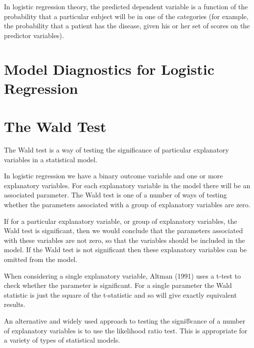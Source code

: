 \documentclass[a4paper,12pt]{article}
\begin{document}
In logistic regression theory, the predicted dependent variable is a function of the probability that a particular subject will be in one of the categories (for example, the probability that a patient has the disease, given his or her set of scores on the predictor variables).


\section{Model Diagnostics for Logistic Regression}



\section{The Wald Test}

The Wald test is a way of testing the significance of particular explanatory variables in a statistical model. 

In logistic regression we have a binary outcome variable and one or more explanatory variables. For each explanatory variable in the model there will be an associated parameter. The Wald test is one of a number of ways of testing whether the parameters associated with a group of explanatory variables are zero.

If for a particular explanatory variable, or group of explanatory variables, the Wald test is significant, then we would conclude that the parameters associated with these variables are not zero, so that the variables should be included in the model. If the Wald test is not significant then these explanatory variables can be omitted from the model. 

When considering a single explanatory variable, Altman (1991) uses a t-test to check whether the parameter is significant. For a single parameter the Wald statistic is just the square of the t-statistic and so will give exactly equivalent results.

An alternative and widely used approach to testing the signi®cance of a number of explanatory variables is to use the likelihood ratio test. This is appropriate for a variety of types of statistical models. 
\end{document}
